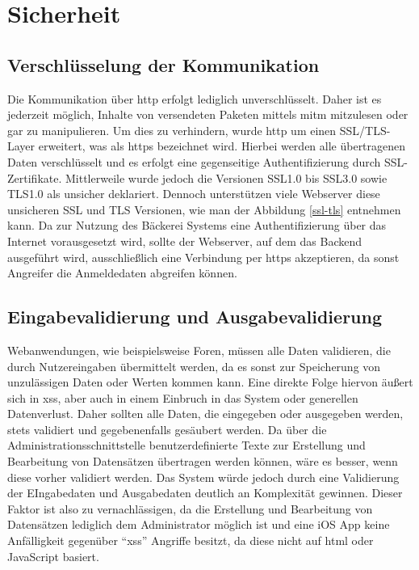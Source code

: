 
\clearpage

\section{Sicherheit}

\subsection{Verschlüsselung der Kommunikation}
Die Kommunikation über \gls{http} erfolgt lediglich unverschlüsselt.
Daher ist es jederzeit möglich, Inhalte von versendeten Paketen mittels \gls{mitm} mitzulesen oder gar zu manipulieren.
Um dies zu verhindern, wurde \gls{http} um einen SSL/TLS-Layer erweitert, was als \gls{https} bezeichnet wird.
Hierbei werden alle übertragenen Daten verschlüsselt und es erfolgt eine gegenseitige Authentifizierung durch SSL-Zertifikate.
Mittlerweile wurde jedoch die Versionen SSL1.0 bis SSL3.0 sowie TLS1.0 als unsicher deklariert.
Dennoch unterstützen viele Webserver diese unsicheren SSL und TLS Versionen, wie man der Abbildung \ref{ssl-tls} entnehmen kann.
Da zur Nutzung des Bäckerei Systems eine Authentifizierung über das Internet vorausgesetzt wird, sollte der Webserver, auf dem das Backend ausgeführt wird, ausschließlich eine Verbindung per \gls{https} akzeptieren, da sonst Angreifer die Anmeldedaten abgreifen können. 


\clearpage

\subsection{Eingabevalidierung und Ausgabevalidierung}
Webanwendungen, wie beispielsweise Foren, müssen alle Daten validieren, die durch Nutzereingaben übermittelt werden, da es sonst zur Speicherung von unzulässigen Daten oder Werten kommen kann. Eine direkte Folge hiervon äußert sich in \gls{xss}, aber auch in einem Einbruch in das System oder generellen Datenverlust.
Daher sollten alle Daten, die eingegeben oder ausgegeben werden, stets validiert und gegebenenfalls gesäubert werden.
Da über die Administrationsschnittstelle benutzerdefinierte Texte zur Erstellung und Bearbeitung von Datensätzen übertragen werden können, wäre es besser, wenn diese vorher validiert werden. Das System würde jedoch durch eine Validierung der EIngabedaten und Ausgabedaten deutlich an Komplexität gewinnen. Dieser Faktor ist also zu vernachlässigen, da die Erstellung und Bearbeitung von Datensätzen lediglich dem Administrator möglich ist und eine iOS App keine Anfälligkeit gegenüber \enquote{xss} Angriffe besitzt, da diese nicht auf \gls{html} oder JavaScript basiert.

